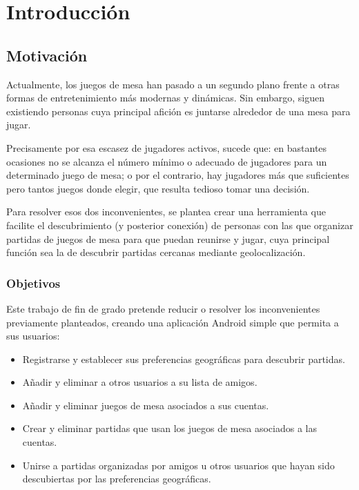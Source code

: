 \chapter{Introducción}

    \section{Motivación}
    
    Actualmente, los juegos de mesa han pasado a un segundo plano frente a otras formas de entretenimiento más modernas y dinámicas. Sin embargo, siguen existiendo personas cuya principal afición es juntarse alrededor de una mesa para jugar.
    
    Precisamente por esa escasez de jugadores activos, sucede que: en bastantes ocasiones no se alcanza el número mínimo o adecuado de jugadores para un determinado juego de mesa; o por el contrario, hay jugadores más que suficientes pero tantos juegos donde elegir, que resulta tedioso tomar una decisión.
    
    Para resolver esos dos inconvenientes, se plantea crear una herramienta que facilite el descubrimiento (y posterior conexión) de personas con las que organizar partidas de juegos de mesa para que puedan reunirse y jugar, cuya principal función sea la de descubrir partidas cercanas mediante geolocalización.
    
    
    \subsection{Objetivos}
    
    Este trabajo de fin de grado pretende reducir o resolver los inconvenientes previamente planteados, creando una aplicación Android simple que permita a sus usuarios:
    
    \begin{itemize}
        \item Registrarse y establecer sus preferencias geográficas para descubrir partidas.
        \item Añadir y eliminar a otros usuarios a su lista de amigos.
        \item Añadir y eliminar juegos de mesa asociados a sus cuentas.
        \item Crear y eliminar partidas que usan los juegos de mesa asociados a las cuentas.
        \item Unirse a partidas organizadas por amigos u otros usuarios que hayan sido descubiertas por las preferencias geográficas.
    \end{itemize}
    

